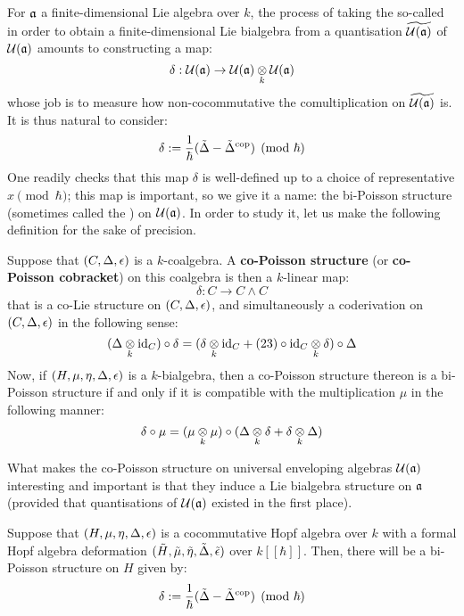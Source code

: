         For $\mathfrak{a}$ a finite-dimensional Lie algebra over $k$, the process of taking the so-called  in order to obtain a finite-dimensional Lie bialgebra from a quantisation $\widetilde{\mathcal{U}(\mathfrak{a})}$ of $\mathcal{U}(\mathfrak{a})$ amounts to constructing a  map:
            $$\delta: \calU(\a) \to \calU(\a) \tensor_k \calU(\a)$$
        whose job is to measure how non-cocommutative the comultiplication on $\widetilde{\mathcal{U}(\mathfrak{a})}$ is. It is thus natural to consider:
            $$\delta := \frac1\hbar(\tilde{\Delta} - \tilde{\Delta}^{\mathrm{cop}}) \pmod{\hbar}$$
        One readily checks that this map $\delta$ is well-defined up to a choice of representative $x \pmod{\hbar}$; this map is important, so we give it a name: the bi-Poisson structure (sometimes called the ) on $\mathcal{U}(\mathfrak{a})$. In order to study it, let us make the following definition for the sake of precision.
        \begin{definition} \label{def: co/bi_poisson_structures}
            Suppose that $(C, \Delta, \epsilon)$ is a $k$-coalgebra. A \textbf{co-Poisson structure} (or \textbf{co-Poisson cobracket}) on this coalgebra is then a $k$-linear map:
                $$\delta: C \to C \wedge C$$
            that is a co-Lie structure on $(C, \Delta, \epsilon)$, and simultaneously a coderivation on $(C, \Delta, \epsilon)$ in the following sense:
                $$(\Delta \tensor_k \id_C) \circ \delta = (\delta \tensor_k \id_C + (23) \circ \id_C \tensor_k \delta) \circ \Delta$$
            Now, if $(H, \mu, \eta, \Delta, \epsilon)$ is a $k$-bialgebra, then a co-Poisson structure thereon is a bi-Poisson structure if and only if it is compatible with the multiplication $\mu$ in the following manner:
                $$\delta \circ \mu = (\mu \tensor_k \mu) \circ (\Delta \tensor_k \delta + \delta \tensor_k \Delta)$$
        \end{definition}
        What makes the co-Poisson structure on universal enveloping algebras $\mathcal{U}(\mathfrak{a})$ interesting and important is that they induce a Lie bialgebra structure on $\mathfrak{a}$ (provided that quantisations of $\mathcal{U}(\mathfrak{a})$ existed in the first place). 
        \begin{lemma} \label{lemma: bi_poisson_structures_from_hopf_algebra_deformations}
            Suppose that $(H, \mu, \eta, \Delta, \epsilon)$ is a cocommutative Hopf algebra over $k$ with a formal Hopf algebra deformation $(\tilde{H}, \tilde{\mu}, \tilde{\eta}, \tilde{\Delta}, \tilde{\epsilon})$ over $k[\![\hbar]\!]$. Then, there will be a bi-Poisson structure on $H$ given by:
                $$\delta := \frac{1}{\hbar}(\tilde{\Delta} - \tilde{\Delta}^{\mathrm{cop}}) \pmod{\hbar}$$
        \end{lemma}
